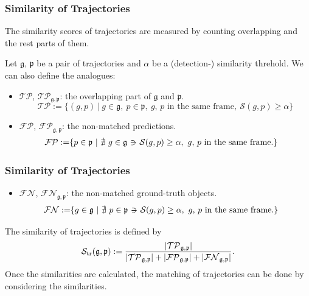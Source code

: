 \documentclass[slidetop, mathserif]{beamer}
\newcommand{\suchthat}{-\hspace{-10pt}\ni\hspace{-10pt}-}
\begin{document}
\begin{frame}
	\frametitle{Similarity of Trajectories}
	
	The similarity scores of trajectories are measured
	by counting overlapping and the rest parts of them.
	
	\vspace{4pt}
	
	Let $\mathfrak g$, $\mathfrak p$ be a pair of trajectories
	and $\alpha$ be a (detection-) similarity threhold.
	We can also define the analogues:
	\begin{itemize}
		\item $\mathcal{TP}$, $\mathcal{TP}_{\mathfrak g, \mathfrak p}$:
		      the overlapping part of $\mathfrak g$ and $\mathfrak p$.
		      \[
		      	\mathcal{TP} := \{(g,p)\ |\ 
		      	g\in\mathfrak g,~
		      	p\in\mathfrak p,~
		      	\text{$g$, $p$ in the same frame},~ \mathcal S(g,p)\geq \alpha\}
		      \]
		\item $\mathcal{FP}$, $\mathcal{FP}_{\mathfrak g, \mathfrak p}$:
		      the non-matched predictions.
		      \begin{align*}
		      	\mathcal{FP} := & \{ p\in\mathfrak p\ |\ 
		      	\nexists\ g\in\mathfrak g ~\suchthat~ \mathcal S(g,p)\geq\alpha,~ \text{$g$, $p$ in the same frame}.\}
		      \end{align*}
	\end{itemize}
	
\end{frame}

\begin{frame}
	\frametitle{Similarity of Trajectories}
	
	\begin{itemize}
		\item $\mathcal{FN}$, $\mathcal{FN}_{\mathfrak g, \mathfrak p}$: the non-matched ground-truth objects.
		      \begin{align*}
		      	\mathcal{FN} := & \{ g\in\mathfrak g\ |\ 
		      	\nexists\ p\in\mathfrak p ~\suchthat~ \mathcal S(g,p)\geq\alpha,~ \text{$g$, $p$ in the same frame}.\}
		      \end{align*}
	\end{itemize}
	
	The similarity of trajectories is defined by
	\[
		\mathcal S_{\rm tr}(\mathfrak g, \mathfrak p) :=
		\dfrac{|\mathcal{TP}_{\mathfrak g,\mathfrak p}|}{
			|\mathcal{TP}_{\mathfrak g,\mathfrak p}|+|\mathcal{FP}_{\mathfrak g,\mathfrak p}|+|\mathcal{FN}_{\mathfrak g,\mathfrak p}|
		}.
	\]
	Once the similarities are calculated,
	the matching of trajectories can be done by considering the similarities.
\end{frame}
\end{document}
